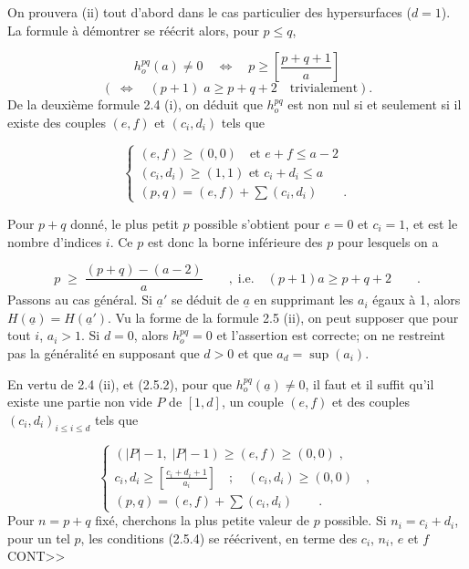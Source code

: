 On prouvera (ii) tout d'abord dans le cas particulier des hypersurfaces ($d = 1$). La formule à démontrer se réécrit alors, pour $p \leqslant q$,

\begin{equation}\tag{2.5.2}
h_o^{pq}(a) \neq 0 \quad \Longleftrightarrow \quad p \geqslant \left[\frac{p+q+1}{a}\right]
\end{equation}
\begin{equation*}
(\; \Longleftrightarrow \quad (p+1) \; a \geqslant p+q+2 \quad \mbox{trivialement}).
\end{equation*}
De la deuxième formule 2.4 (i), on déduit que $h_o^{pq}$ est non nul si et seulement si il existe des couples $(e,f)$ et $(c_i,d_i)$ tels que

\begin{equation}\tag{2.5.3}
\left\{
\begin{array}{l}
(e,f) \geqslant (0,0) \quad \mbox{et } e+f \leqslant a-2 \\[3mm]
(c_i,d_i) \geqslant (1,1) \mbox{ et } c_i+d_i \leqslant a \\[3mm]
(p,q) = (e,f) + \sum (c_i,d_i) \qquad .
\end{array}
\right.
\end{equation}


Pour $p+q$ donné, le plus petit $p$ possible s'obtient pour $e = 0$ et $c_i = 1$, et est le nombre d'indices $i$. Ce $p$ est donc la borne inférieure des $p$ pour lesquels on a

\begin{equation*}
p \;\geqslant\; \frac{(p+q)-(a-2)}{a} \qquad , \; \mbox{i.e.} \quad (p+1)a \geqslant p+q+2 \qquad .
\end{equation*}
Passons au cas général. Si $\underline{a}'$ se déduit de $\underline{a}$ en supprimant les $a_i$ égaux à 1, alors $H(\underline{a}) = H(\underline{a}')$. Vu la forme de la formule 2.5 (ii), on peut supposer que pour tout $i$, $a_i > 1$. Si $d = 0$, alors $h_o^{pq} = 0$ et l'assertion est correcte; on ne restreint pas la généralité en supposant que $d > 0$ et que $a_d = \sup(a_i)$.

En vertu de 2.4 (ii), et (2.5.2), pour que $h_o^{pq}(\underline{a}) \neq 0$, il faut et il suffit qu'il existe une partie non vide $P$ de $[1,d]$, un couple $(e,f)$ et des couples $(c_i,d_i)_{i \leqslant i \leqslant d}$ tels que

\begin{equation}\tag{2.5.4}
\left\{
\begin{array}{l}
(|P|-1, \; |P|-1) \geqslant (e,f) \geqslant (0,0) \; , \\[3mm]
c_i,d_i \geqslant \left[{\displaystyle \frac{c_i+d_i+1}{a_i}}\right] \quad ; \quad (c_i,d_i) \geqslant (0,0) \quad , \\[3mm]
(p,q) = (e,f) + \sum (c_i,d_i) \qquad .
\end{array}
\right.
\end{equation}
Pour $n = p+q$ fixé, cherchons la plus petite valeur de $p$ possible. Si $n_i = c_i + d_i$, pour un tel $p$, les conditions (2.5.4) se réécrivent, en terme des $c_i$, $n_i$, $e$ et $f$ CONT>>


